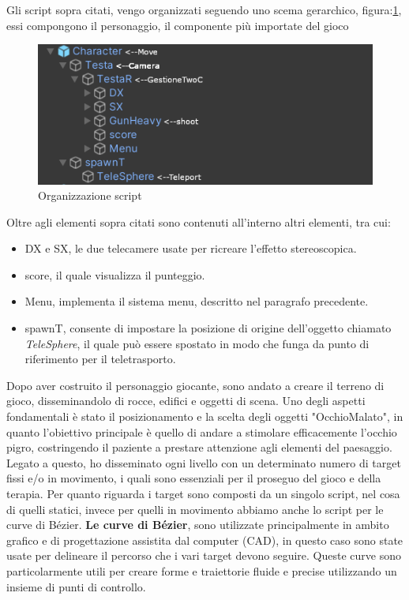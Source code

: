 \documentclass[
a4paper,
cleardoublepage=empty,
headings=twolinechapter,
numbers=autoenddot,
]{scrbook}
\begin{document}
    Gli script sopra citati, vengo organizzati seguendo uno scema gerarchico, figura:\ref{fig:script_character}, essi compongono il personaggio, il componente più importate del gioco
    \begin{figure}[h]
    	\centering
    	\includegraphics[width=0.8\linewidth]{image/script_character}
    	\caption{Organizzazione script}
    	\label{fig:script_character}
    \end{figure}
    Oltre agli elementi sopra citati sono contenuti all'interno altri elementi, tra cui:
    \begin{itemize}
        \item DX e SX, le due telecamere usate per ricreare l'effetto stereoscopica.
        \item score, il quale visualizza il punteggio.
        \item Menu, implementa il sistema menu, descritto nel paragrafo precedente.
        \item spawnT, consente di impostare la posizione di origine dell'oggetto chiamato \textit{TeleSphere}, il quale può essere spostato in modo che funga da punto di riferimento per il teletrasporto.
    \end{itemize}
    Dopo aver costruito il personaggio giocante, sono andato a creare il terreno di gioco, disseminandolo di rocce, edifici e oggetti di scena.
    Uno degli aspetti fondamentali è stato il posizionamento e la scelta degli oggetti "OcchioMalato", in quanto l'obiettivo principale è quello di andare a stimolare efficacemente l'occhio pigro, costringendo il paziente a prestare attenzione agli elementi del paesaggio.
    Legato a questo, ho disseminato ogni livello con un determinato numero di target fissi e/o in movimento, i quali sono essenziali per il proseguo del gioco e della terapia.
    Per quanto riguarda i target sono composti da un singolo script, nel cosa di quelli statici, invece per quelli in movimento abbiamo anche lo script per le curve di Bézier\cite{Pack_asset}.
    \textbf{Le curve di Bézier}\cite{Path_asset}, sono utilizzate principalmente in ambito grafico e di progettazione assistita dal computer (CAD), in questo caso sono state usate per delineare il percorso che i vari target devono seguire. Queste curve sono particolarmente utili per creare forme e traiettorie fluide e precise utilizzando un insieme di punti di controllo.
\end{document}
